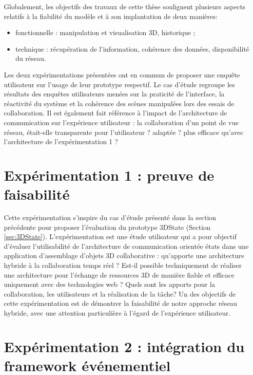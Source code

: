 Globalement, les objectifs des travaux de cette thèse soulignent plusieurs aspects relatifs à la fiabilité 
du modèle et à son implantation de deux manières: 
\begin{itemize}
	\item fonctionnelle : manipulation et visualisation 
	3D, historique ;
	\item technique : récupération de l'information, cohérence des 
	données, disponibilité du réseau.
\end{itemize}

Les deux expérimentations présentées ont en commun de proposer une enquête 
utilisateur sur l'usage de leur prototype respectif. Le cas d'étude regroupe les 
résultats des enquêtes utilisateurs menées sur la praticité de l'interface, la réactivité du système et la cohérence des scènes manipulées lors des essais de collaboration. 
Il est également fait référence à l'impact de l'architecture de communication 
sur l'expérience utilisateur : la collaboration d'un point de vue réseau, était-elle 
transparente pour l'utilisateur ? adaptée ? plus efficace qu'avec l'architecture de 
l'expérimentation 1 ?




\section{Expérimentation 1 : preuve de faisabilité}
Cette expérimentation s'inspire du cas d'étude présenté dans la section 
précédente pour proposer l'évaluation du prototype 3DState (Section 
\ref{sec:3DState}). L'expérimentation est une étude utilisateur qui a pour objectif 
d'évaluer l'utilisabilité de l'architecture de communication \og orientée états\fg{} 
dans une application d'assemblage d'objets 3D collaborative : qu'apporte une 
architecture hybride à la 
collaboration temps réel ? Est-il possible techniquement de réaliser une 
architecture pour l'échange de ressources \gls{3D} de manière fiable et 
efficace uniquement avec des technologies web ? Quels sont les apports pour la 
collaboration, les utilisateurs et la réalisation de la tâche?
Un des objectifs de cette expérimentation est de démontrer la faisabilité de notre 
approche réseau hybride, avec une attention particulière à l'égard de l'expérience 
utilisateur.



\section{Expérimentation 2 : intégration du framework événementiel}
\label{sec:xp2}

